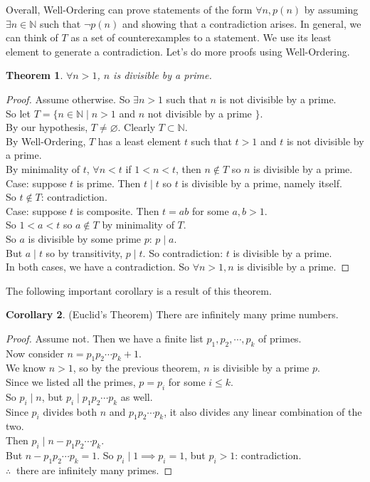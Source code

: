 \documentclass[11pt]{amsart}
\newtheorem{theorem}{Theorem}[section]
\theoremstyle{definition}
\newtheorem{corollary}[theorem]{Corollary}
\newcommand{\naturals}{\mathbb{N}}
\let\emptyset\varnothing
\begin{document}
Overall, Well-Ordering can prove statements of the form $\forall n, p(n)$ by assuming $\exists n \in \naturals$ such that $\lnot p(n)$ and showing
that a contradiction arises. In general, we can think of $T$ as a set of counterexamples to a statement. We use its least element to generate
a contradiction. Let's do more proofs using Well-Ordering.
\begin{theorem}
	$\forall n > 1$, $n$ is divisible by a prime.
\end{theorem}
\begin{proof}
	Assume otherwise. So $\exists n > 1$ such that $n$ is not divisible by a prime. \\
	So let $T = \{ n \in \naturals \mid n > 1$ and $n$ not divisible by a prime $\}$. \\
	By our hypothesis, $T \neq \emptyset$. Clearly $T \subset \naturals$. \\
	By Well-Ordering, $T$ has a least element $t$ such that $t > 1$ and $t$ is not divisible by a prime. \\
	By minimality of $t$, $\forall n < t$ if $1 < n < t$, then $n \notin T$ so $n$ is divisible by a prime. \\
	Case: suppose $t$ is prime. Then $t \mid t$ so $t$ is divisible by a prime, namely itself. \\
	So $t \notin T$: contradiction. \\
	Case: suppose $t$ is composite. Then $t = ab$ for some $a, b > 1$. \\
	So $1 < a < t$ so $a \notin T$ by minimality of $T$. \\
	So $a$ is divisible by some prime $p$: $p \mid a$. \\
	But $a \mid t$ so by transitivity, $p \mid t$. So contradiction: $t$ is divisible by a prime. \\
	In both cases, we have a contradiction. So $\forall n > 1, n$ is divisible by a prime.
\end{proof}
The following important corollary is a result of this theorem.
\begin{corollary}(Euclid's Theorem)
	There are infinitely many prime numbers.
\end{corollary}
\begin{proof}
	Assume not. Then we have a finite list $p_1, p_2, \cdots, p_k$ of primes. \\
	Now consider $n = p_1 p_2 \cdots p_k + 1$. \\
	We know $n > 1$, so by the previous theorem, $n$ is divisible by a prime $p$. \\
	Since we listed all the primes, $p = p_i$ for some $i \leq k$. \\
	So $p_i \mid n$, but $p_i \mid p_1 p_2 \cdots p_k$ as well. \\
	Since $p_i$ divides both $n$ and $p_1 p_2 \cdots p_k$, it also divides any linear combination of the two. \\
	Then $p_i \mid n - p_1 p_2 \cdots p_k$. \\
	But $n - p_1 p_2 \cdots p_k = 1$. So $p_i \mid 1 \implies p_i = 1$, but $p_i > 1$: contradiction. \\
	$\therefore \:$ there are infinitely many primes.
\end{proof}
\end{document}
